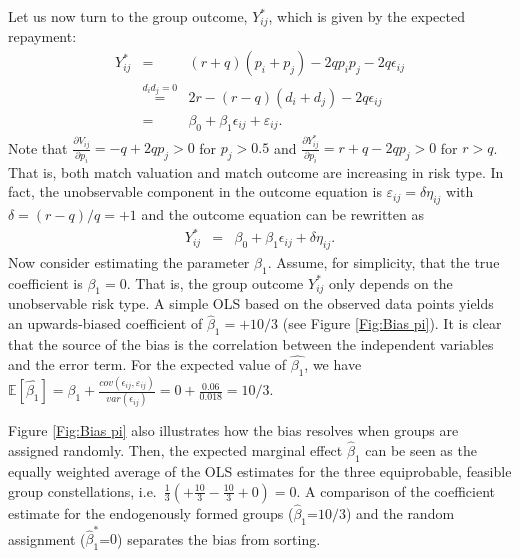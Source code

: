 \noindent Let us now turn to the group outcome, $Y^*_{ij}$, which is given by the expected repayment: %
\begin{eqnarray}
Y^*_{ij} &=& (r+q)(p_i+p_j) - 2qp_ip_j - 2q\epsilon_{ij} \\
         &\stackrel{d_id_j=0}{=}& 2r - (r-q)(d_i+d_j) - 2q\epsilon_{ij}\\
         &=& \beta_0 + \beta_1\epsilon_{ij} + \varepsilon_{ij}.
\end{eqnarray}
\noindent Note that $\frac{\partial V_{ij}}{\partial p_i}=-q+2qp_j>0$ for $p_j>0.5$ and $\frac{\partial Y^*_{ij}}{\partial p_i}=r+q-2qp_j>0$ for $r>q$. That is, both match valuation and match outcome are increasing in risk type. In fact, the unobservable component in the outcome equation is $\varepsilon_{ij}=\delta\eta_{ij}$ with $\delta=(r-q)/q=+1$ and the outcome equation can be rewritten as %
\begin{eqnarray}
Y^*_{ij} &=& \beta_0 + \beta_1\epsilon_{ij} + \delta\eta_{ij}. \label{Eqn:ExampleOutcomeEqn}
\end{eqnarray}
Now consider estimating the parameter $\beta_1$. Assume, for simplicity, that the true coefficient is $\beta_1=0$. That is, the group outcome $Y^*_{ij}$ only depends on the unobservable risk type. A simple OLS based on the observed data points yields an upwards-biased coefficient of $\hat \beta_1=+10/3$ (see Figure \ref{Fig:Bias pi}). It is clear that the source of the bias is the correlation between the independent variables and the error term. For the expected value of $\hat{\beta_1}$, we have $\mathbb E[\hat{\beta_1}] = \beta_1 + \frac{cov(\epsilon_{ij}, \varepsilon_{ij})}{var(\epsilon_{ij})} = 0 + \frac{0.06}{0.018} = 10/3$.


Figure \ref{Fig:Bias pi} also illustrates how the bias resolves when groups are assigned randomly. %
Then, the expected marginal effect $\hat \beta_1$ can be seen as the equally weighted average of the OLS estimates for the three equiprobable, feasible group constellations, i.e.\ $\frac{1}{3}(+\frac{10}{3}-\frac{10}{3}+0)=0$. 
A comparison of the coefficient estimate for the endogenously formed groups ($\hat \beta_1$=$10/3$) and the random assignment ($\hat \beta_1^*$=$0$) separates the bias from sorting.

